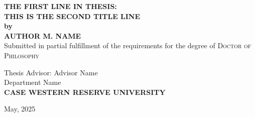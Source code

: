 \documentclass[12pt, oneside]{book}
\newcommand{\thesistitle}{The First Line in Thesis:\\This is the Second Title Line\\}
\newcommand{\authorname}{Author M. Name}
\newcommand{\degreename}{Doctor of Philosophy}
\begin{document}


\begin{titlepage}
\begin{center}
\Large{\bfseries\MakeUppercase{
    \thesistitle
 }}
 \vspace{.5cm}
 \large{\bfseries{by}}\\
 \vspace{.5cm}
\Large{\bfseries\MakeUppercase{\authorname}}\\

\vspace{1cm}
 \large{Submitted in partial fulfillment of the requirements for the degree of \textsc{\degreename}}\\[0.75cm]
\vfill

{Thesis Advisor: Advisor Name} \vspace{0.4cm} \\[.75cm]
 \vfill
\large{Department Name}\\[.75cm]
\vfill
\large{\bfseries\MakeUppercase{Case Western Reserve University}}\\[0.5cm]
\vfill

{May, 2025}
\end{center}
\end{titlepage}
\end{document}
